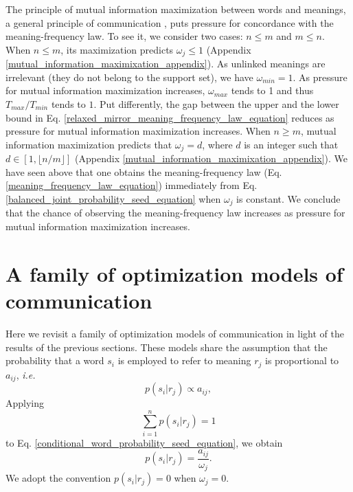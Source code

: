 \documentclass{article}
\begin{document}
The principle of mutual information maximization between words and meanings, a general principle of communication \cite{Ferrer2013g}, puts pressure for concordance with the meaning-frequency law. To see it, we consider two cases: $n\leq m$ and $m \leq n$. When $n \leq m$, its maximization predicts $\omega_j \leq 1$ (Appendix \ref{mutual_information_maximixation_appendix}). As unlinked meanings are irrelevant (they do not belong to the support set), we have $\omega_{min} = 1$. As pressure for mutual information maximization increases, $\omega_{max}$ tends to 1 and thus $T_{max}/T_{min}$ tends to $1$. Put differently, the gap between the upper and the lower bound in Eq. \ref{relaxed_mirror_meaning_frequency_law_equation} reduces as pressure for mutual information maximization increases. When $n \geq m$, mutual information maximization predicts that $\omega_j = d$, where $d$ is an integer such that $d \in [1, \lfloor n/m \rfloor]$ (Appendix \ref{mutual_information_maximixation_appendix}). We have seen above that one obtains the meaning-frequency law (Eq. \ref{meaning_frequency_law_equation}) immediately from Eq. \ref{balanced_joint_probability_seed_equation} when $\omega_j$ is constant. We conclude that the chance of observing the meaning-frequency law increases as pressure for mutual information maximization increases.    

\section*{A family of optimization models of communication}

Here we revisit a family of optimization models of communication \cite{Ferrer2007a} in light of the results of the previous sections. 
These models share the assumption that the probability that a word $s_i$ is employed to refer to meaning $r_j$ is proportional to $a_{ij}$, {\em i.e.}
\begin{equation}
p(s_i | r_j) \propto a_{ij},
\label{conditional_word_probability_seed_equation}
\end{equation}
Applying 
\begin{equation*}
\sum_{i=1}^n p(s_i | r_j) = 1
\end{equation*}
to Eq. \ref{conditional_word_probability_seed_equation}, we obtain
\begin{equation}
p(s_i | r_j) = \frac{a_{ij}}{\omega_j}.
\label{conditional_word_probability_equation}
\end{equation}
We adopt the convention $p(s_i|r_j) = 0$ when $\omega_j = 0$.   
\end{document}
